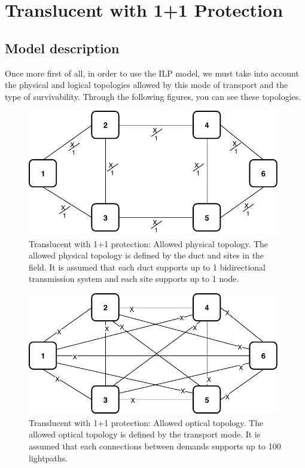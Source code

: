 \clearpage

\section{Translucent with 1+1 Protection}\label{ILP_Transluc_Protection}

\subsection{Model description}

Once more first of all, in order to use the ILP model, we must take into account the physical and logical topologies allowed by this mode of transport and the type of survivability. Through the following figures, you can see these topologies. \\

\begin{figure}[h!]
\centering
\includegraphics[width=11cm]{sdf/ilp/translucent_protection/figures/allowed_physical_topology}
\caption{Translucent with 1+1 protection: Allowed physical topology. The allowed physical topology is defined by the duct and sites in the field. It is assumed that each duct supports up to 1 bidirectional transmission system and each site supports up to 1 node.}
\label{allowed3_physical_protectionlow}
\end{figure}

\vspace{15pt}
\begin{figure}[h!]
\centering
\includegraphics[width=11cm]{sdf/ilp/translucent_protection/figures/allowed_optical_topology}
\caption{Translucent with 1+1 protection: Allowed optical topology. The allowed optical topology is defined by the transport mode. It is assumed that each connections between demands supports up to 100 lightpaths.}
\label{allowed3_optical_protectionlow}
\end{figure}

